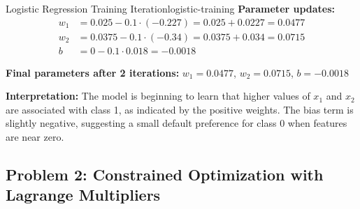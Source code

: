 \documentclass[12pt]{article}
\begin{document}
\begin{example}{Logistic Regression Training Iteration}{logistic-training}
\textbf{Parameter updates:}
\begin{align}
w_1 &= 0.025 - 0.1 \cdot (-0.227) = 0.025 + 0.0227 = 0.0477 \\
w_2 &= 0.0375 - 0.1 \cdot (-0.34) = 0.0375 + 0.034 = 0.0715 \\
b &= 0 - 0.1 \cdot 0.018 = -0.0018
\end{align}

\textbf{Final parameters after 2 iterations:} $w_1 = 0.0477$, $w_2 = 0.0715$, $b = -0.0018$

\textbf{Interpretation:} The model is beginning to learn that higher values of $x_1$ and $x_2$ are associated with class 1, as indicated by the positive weights. The bias term is slightly negative, suggesting a small default preference for class 0 when features are near zero.
\end{example}

\subsection{Problem 2: Constrained Optimization with Lagrange Multipliers}
\end{document}
